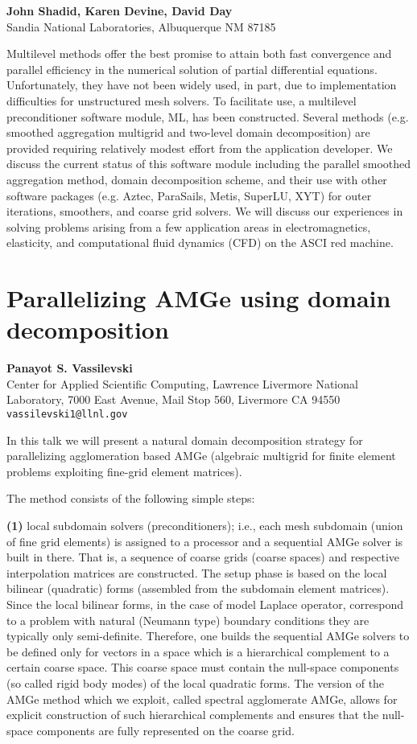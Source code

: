\documentclass[11pt]{article}
\newcommand{\nextab}[4]{
	\section{#2}
	{\bf #1} \\ \nopagebreak
	{#3} \\ \nopagebreak
	{\tt #4} \nopagebreak
	}
\begin{document}
{\bf John Shadid, Karen Devine, David Day} \\
Sandia National Laboratories, Albuquerque NM 87185


Multilevel methods offer the best promise to attain both
fast convergence and parallel efficiency in the numerical
solution of partial differential equations. Unfortunately,
they have not been widely used, in part, due to
implementation difficulties for unstructured mesh solvers.
To facilitate use, a multilevel preconditioner software
module, ML, has been constructed. Several methods (e.g.
smoothed aggregation multigrid and two-level domain
decomposition) are provided requiring relatively modest
effort from the application developer. We discuss the
current status of this software module including the
parallel smoothed aggregation method, domain decomposition
scheme, and their use with other software packages (e.g.
Aztec, ParaSails, Metis, SuperLU, XYT) for outer
iterations, smoothers, and coarse grid solvers. We will
discuss our experiences in solving problems arising from a
few application areas in electromagnetics, elasticity, and
computational fluid dynamics (CFD) on the ASCI red
machine.




\nextab
{Panayot S. Vassilevski}
{Parallelizing AMGe using domain decomposition}
{Center for Applied Scientific Computing, Lawrence Livermore National Laboratory, 7000 East Avenue, Mail Stop 560, Livermore CA 94550}
{vassilevski1@llnl.gov}


In this talk we will present a natural domain decomposition
strategy for parallelizing agglomeration based AMGe
(algebraic multigrid for finite element problems exploiting
fine-grid element matrices).


The method consists of the following simple steps:


{\bf (1)}   local subdomain solvers (preconditioners); i.e., each
mesh subdomain (union of fine grid elements) is assigned to
a processor and a sequential AMGe solver is built in there.
That is, a sequence of coarse grids (coarse spaces) and
respective interpolation matrices are constructed. The
setup phase is based on the local bilinear (quadratic)
forms (assembled from the subdomain element matrices).
Since the local bilinear forms, in the case of model
Laplace operator, correspond to a problem with natural
(Neumann type) boundary conditions they are typically only
semi-definite. Therefore, one builds the sequential AMGe
solvers to be defined only for vectors in a space which is
a hierarchical complement to a certain coarse space. This
coarse space must contain the null-space components (so
called rigid body modes) of the local quadratic forms. The
version of the AMGe method which we exploit, called
spectral agglomerate AMGe, allows for explicit construction
of such hierarchical complements and ensures that the
null-space components are fully represented on the coarse
grid.
\end{document}
